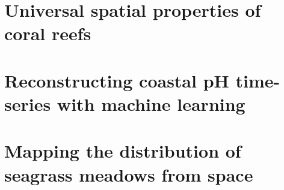 \documentclass[
	10pt, %
	fleqn, %
	a4paper, %
]{LegrandOrangeBook}
\begin{document}
\chapterspaceabove{6.75cm}
\chapterspacebelow{7.25cm}

\chapter{Universal spatial properties of coral reefs}
%

\chapterspaceabove{6.75cm}
\chapterspacebelow{7.25cm}

\chapter{Reconstructing coastal pH time-series with machine learning}
%

\chapterspaceabove{6.75cm}
\chapterspacebelow{7.25cm}

\chapter{Mapping the distribution of seagrass meadows from space}
%

\stopcontents[part] %


\chapterimage{} %
\chapterspaceabove{2.5cm} %
\chapterspacebelow{2cm} %
\end{document}
